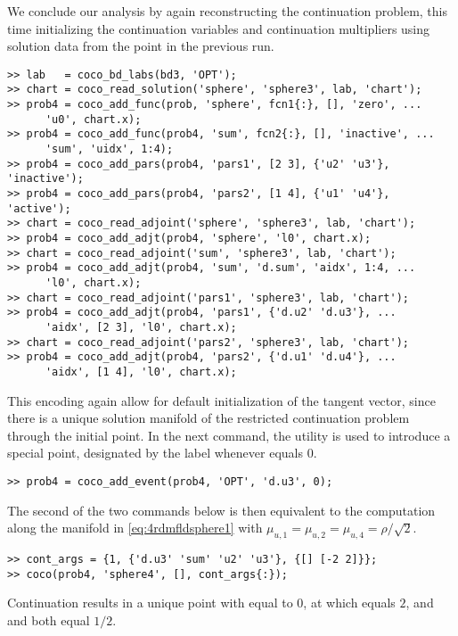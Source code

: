 We conclude our analysis by again reconstructing the continuation problem, this time initializing the continuation variables and continuation multipliers using solution data from the  point in the previous run.
\begin{lstlisting}[language=coco-highlight]
>> lab   = coco_bd_labs(bd3, 'OPT');
>> chart = coco_read_solution('sphere', 'sphere3', lab, 'chart');
>> prob4 = coco_add_func(prob, 'sphere', fcn1{:}, [], 'zero', ...
      'u0', chart.x);
>> prob4 = coco_add_func(prob4, 'sum', fcn2{:}, [], 'inactive', ...
      'sum', 'uidx', 1:4);
>> prob4 = coco_add_pars(prob4, 'pars1', [2 3], {'u2' 'u3'}, 'inactive');
>> prob4 = coco_add_pars(prob4, 'pars2', [1 4], {'u1' 'u4'}, 'active');
>> chart = coco_read_adjoint('sphere', 'sphere3', lab, 'chart');
>> prob4 = coco_add_adjt(prob4, 'sphere', 'l0', chart.x);
>> chart = coco_read_adjoint('sum', 'sphere3', lab, 'chart');
>> prob4 = coco_add_adjt(prob4, 'sum', 'd.sum', 'aidx', 1:4, ...
      'l0', chart.x);
>> chart = coco_read_adjoint('pars1', 'sphere3', lab, 'chart');
>> prob4 = coco_add_adjt(prob4, 'pars1', {'d.u2' 'd.u3'}, ...
      'aidx', [2 3], 'l0', chart.x);
>> chart = coco_read_adjoint('pars2', 'sphere3', lab, 'chart');
>> prob4 = coco_add_adjt(prob4, 'pars2', {'d.u1' 'd.u4'}, ...
      'aidx', [1 4], 'l0', chart.x);
\end{lstlisting}      
This encoding again allow for default initialization of the tangent vector, since there is a unique solution manifold of the restricted continuation problem through the initial point. In the next command, the  utility is used to introduce a special point, designated by the label  whenever  equals $0$. 
\begin{lstlisting}[language=coco-highlight]
>> prob4 = coco_add_event(prob4, 'OPT', 'd.u3', 0);
\end{lstlisting}
The second of the two commands below is then equivalent to the computation along the manifold in \eqref{eq:4rdmfldsphere1} with $\mu_{u,1}=\mu_{u,2}=\mu_{u,4}=\rho/\sqrt{2}$.
\begin{lstlisting}[language=coco-highlight]
>> cont_args = {1, {'d.u3' 'sum' 'u2' 'u3'}, {[] [-2 2]}};
>> coco(prob4, 'sphere4', [], cont_args{:});
\end{lstlisting}
Continuation results in a unique point with  equal to $0$, at which  equals $2$, and  and  both equal $1/2$.\\
\medskip

